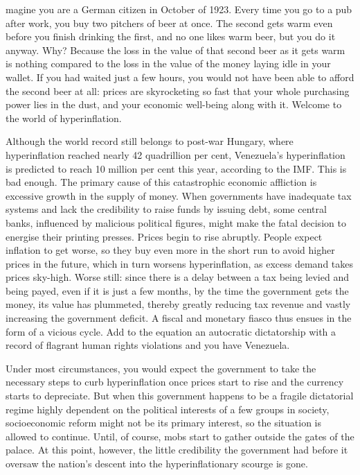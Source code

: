 \label{ch:venezuelan-hyperinflation}

{\flushright{}}
\smallskip

magine you are a German citizen in October of 1923. Every time you go to
   a pub after work, you buy two pitchers of beer at once. The second gets
   warm even before you finish drinking the first, and no one likes warm
   beer, but you do it anyway. Why? Because the loss in the value of that
   second beer as it gets warm is nothing compared to the loss in the
   value of the money laying idle in your wallet. If you had waited just a
   few hours, you would not have been able to afford the second beer at
   all: prices are skyrocketing so fast that your whole purchasing power
   lies in the dust, and your economic well-being along with it. Welcome
   to the world of hyperinflation.

   Although the world record still belongs to post-war Hungary, where
   hyperinflation reached nearly 42 quadrillion per cent, Venezuela's
   hyperinflation is predicted to reach 10 million per cent this year,
   according to the IMF. This is bad enough. The primary cause of this
   catastrophic economic affliction is excessive growth in the supply of
   money. When governments have inadequate tax systems and lack the
   credibility to raise funds by issuing debt, some central banks,
   influenced by malicious political figures, might make the fatal
   decision to energise their printing presses. Prices begin to rise
   abruptly. People expect inflation to get worse, so they buy even more
   in the short run to avoid higher prices in the future, which in turn
   worsens hyperinflation, as excess demand takes prices sky-high. Worse
   still: since there is a delay between a tax being levied and being
   payed, even if it is just a few months, by the time the government gets
   the money, its value has plummeted, thereby greatly reducing tax
   revenue and vastly increasing the government deficit. A fiscal and
   monetary fiasco thus ensues in the form of a vicious cycle. Add to the
   equation an autocratic dictatorship with a record of flagrant human
   rights violations and you have Venezuela.

   Under most circumstances, you would expect the government to take the
   necessary steps to curb hyperinflation once prices start to rise and
   the currency starts to depreciate. But when this government happens to
   be a fragile dictatorial regime highly dependent on the political
   interests of a few groups in society, socioeconomic reform might not be
   its primary interest, so the situation is allowed to continue. Until,
   of course, mobs start to gather outside the gates of the palace. At
   this point, however, the little credibility the government had before
   it oversaw the nation's descent into the hyperinflationary scourge is
   gone.

